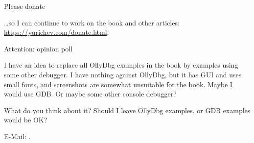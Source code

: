 \vspace*{\fill}

\huge Please donate
\normalsize

\bigskip
\bigskip
\bigskip

\dots so I can continue to work on the book and other articles: \\
\url{https://yurichev.com/donate.html}.

\bigskip
\bigskip
\bigskip

\huge Attention: opinion poll
\normalsize

\bigskip
\bigskip
\bigskip

I have an idea to replace all OllyDbg examples in the book by examples using some other debugger.
I have nothing against OllyDbg, but it has GUI and uses small fonts, and screenshots are somewhat unsuitable for the book.
Maybe I would use GDB.
Or maybe some other console debugger?

What do you think about it?
Should I leave OllyDbg examples, or GDB examples would be OK?

E-Mail: \GTT{\EMAIL}.

\vspace*{\fill}
\vfill
